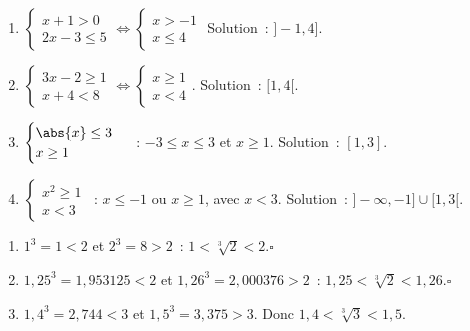 
\begin{enumerate}
  \item $\begin{cases}x+1>0\\2x-3\leq5\end{cases}\Leftrightarrow\begin{cases}x>-1\\x\leq4\end{cases}$
        Solution~: $]-1,4]$.
  \item $\begin{cases}3x-2\geq1\\x+4<8\end{cases}
        \Leftrightarrow\begin{cases}x\geq1\\x<4\end{cases}$.
        Solution~: $[1,4[$.
  \item $\begin{cases}\abs{x}\leq3\\x\geq1\end{cases}$~:
        $-3\leq x\leq3$ et $x\geq1$. Solution~: $[1,3]$.
  \item $\begin{cases}x^2\geq1\\x<3\end{cases}$~:
        $x\leq-1$ ou $x\geq1$, avec $x<3$.
        Solution~: $]-\infty,-1]\cup[1,3[$.
\end{enumerate}


\begin{enumerate}
  \item $1^3=1<2$ et $2^3=8>2$~: $1<\sqrt[3]{2}<2$.\hfill$\square$
  \item $1{,}25^3=1{,}953125<2$ et $1{,}26^3=2{,}000376>2$~:
        $1{,}25<\sqrt[3]{2}<1{,}26$.\hfill$\square$
  \item $1{,}4^3=2{,}744<3$ et $1{,}5^3=3{,}375>3$.
        Donc $1{,}4<\sqrt[3]{3}<1{,}5$.
\end{enumerate}

